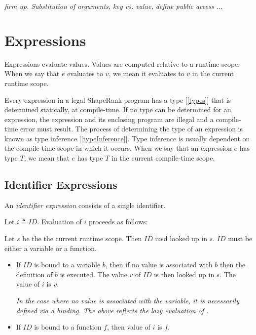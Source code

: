 \documentclass{article}
\begin{document}
{\em firm up. Substitution of arguments, key vs. value, define public access ...}





\section{Expressions}
\label{expressions}

Expressions evaluate values. Values are computed relative to a runtime scope. When we say that $e$ evaluates to $v$, we mean it evaluates to $v$ in the current runtime scope. 

Every expression in a legal ShapeRank program has a type [\ref{types}] that is determined statically, at compile-time. If no type can be determined for an expression, the expression and its enclosing program are illegal and a compile-time error must result. The process of determining the type of an expression is known as type inference [\ref{typeInference}]. Type inference  is usually dependent on the compile-time scope in which it occurs. When we say that an expression $e$ has type $T$, we mean that $e$ has type $T$ in the current compile-time scope.

\subsection{Identifier Expressions}
\label{identifierExpressions}

An {\em identifier expression} consists of a single identifier.

\IdentifierExpression{}

Let $i \triangleq ID$.
Evaluation of $i$ proceeds as follows:


Let $s$ be the the current runtime scope. Then $ID$ iusd looked up in $s$. $ID$ must be either a variable or a function.
\begin{itemize}
\item If $ID$ is bound to a variable $b$, then if no value is associated with $b$ then the definition of $b$ is executed. The value $v$ of $ID$ is then looked up in $s$. The value of $i$ is $v$.

{\em In the case where no value is associated with the variable, it is necessarily defined via  a \LET{} binding. The above reflects the lazy evaluation of \LET{}.}

\item If $ID$ is bound to a function $f$, then value of $i$ is $f$. 
\end{itemize}
\end{document}
